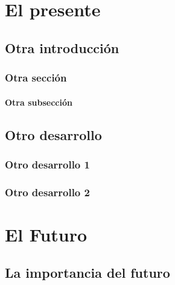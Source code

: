 \documentclass[12pt,c5paper,oneside]{book} %
\begin{document}
\lipsum[2-4]

\clearpage{\pagestyle{empty}\cleardoublepage}

\part{El presente}

\chapter{Otra introducción}

\lipsum[1-4]

\section{Otra sección}

\lipsum[1-3]

\subsection{Otra subsección}

\lipsum[4-6]

\clearpage{\pagestyle{empty}\cleardoublepage}

\chapter{Otro desarrollo}

\lipsum[1-4]

\section{Otro desarrollo 1}

\lipsum[1-2]

\section{Otro desarrollo 2}

\lipsum[2-4]

\clearpage{\pagestyle{empty}\cleardoublepage}

\part{El Futuro}


\chapter{La importancia del futuro}
\end{document}
